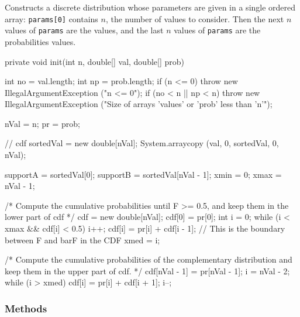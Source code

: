 \begin{tabb}
   Constructs a discrete distribution whose parameters are given
   in a single ordered array: \texttt{params[0]} contains $n$, the number of
   values to consider. Then the next $n$ values of \texttt{params} are the
   values, and the last $n$ values of \texttt{params}
   are the probabilities values.
\end{tabb}
\begin{hide}\begin{code}

   private void init(int n, double[] val, double[] prob) {
      int no = val.length;
      int np = prob.length;
      if (n <= 0)
         throw new IllegalArgumentException ("n <= 0");
      if (no < n || np < n)
         throw new IllegalArgumentException
         ("Size of arrays 'values' or 'prob' less than 'n'");

      nVal = n;
      pr = prob;

      // cdf
      sortedVal = new double[nVal];
      System.arraycopy (val, 0, sortedVal, 0, nVal);

      supportA = sortedVal[0];
      supportB = sortedVal[nVal - 1];
      xmin = 0;
      xmax = nVal - 1;

      /* Compute the cumulative probabilities until F >= 0.5, and keep them in
         the lower part of cdf */
      cdf = new double[nVal];
      cdf[0] = pr[0];
      int i = 0;
      while (i < xmax && cdf[i] < 0.5) {
         i++;
         cdf[i] = pr[i] + cdf[i - 1];
      }
      // This is the boundary between F and barF in the CDF
      xmed = i;

      /* Compute the cumulative probabilities of the complementary
         distribution and keep them in the upper part of cdf. */
      cdf[nVal - 1] = pr[nVal - 1];
      i = nVal - 2;
      while (i > xmed) {
         cdf[i] = pr[i] + cdf[i + 1];
         i--;
      }
}\end{code}\end{hide}


\subsubsection* {Methods}

